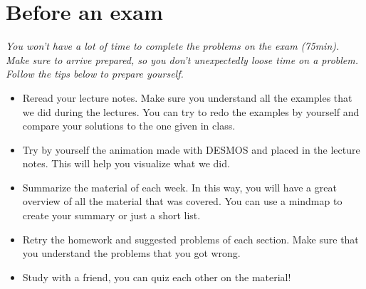 \documentclass[12pt]{amsart}
\begin{document}
\section*{Before an exam}
\textit{You won't have a lot of time to complete the problems on the exam (75min). Make sure to arrive prepared, so you don't unexpectedly loose time on a problem. Follow the tips below to prepare yourself.}
	\begin{itemize}
	\item Reread your lecture notes. Make sure you understand all the examples that we did during the lectures. You can try to redo the examples by yourself and compare your solutions to the one given in class. 
	\item Try by yourself the animation made with DESMOS and placed in the lecture notes. This will help you visualize what we did.
	\item Summarize the material of each week. In this way, you will have a great overview of all the material that was covered. You can use a mindmap to create your summary or just a short list.
	\item Retry the homework and suggested problems of each section. Make sure that you understand the problems that you got wrong. 
	\item Study with a friend, you can quiz each other on the material!
	\end{itemize}
\end{document}
